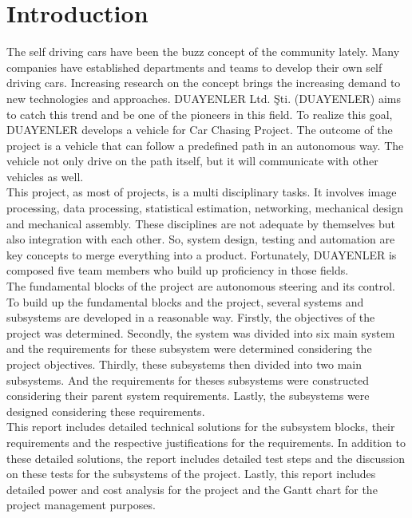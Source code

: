 \documentclass[a4paper,12pt]{article}
\begin{document}

\tableofcontents

\newpage


\section{Introduction}

The self driving cars have been the buzz concept of the community lately. Many companies have established departments and teams to develop their own self driving cars. Increasing research on the concept brings the increasing demand to new technologies and approaches. DUAYENLER Ltd. Şti. (DUAYENLER) aims to catch this trend and be one of the pioneers in this field. To realize this goal, DUAYENLER develops a vehicle for Car Chasing Project. The outcome of the project is a vehicle that can follow a predefined path in an autonomous way. The vehicle not only drive on the path itself, but it will communicate with other vehicles as well.\\

This project, as most of projects, is a multi disciplinary tasks. It involves image processing, data processing, statistical estimation, networking, mechanical design and mechanical assembly. These disciplines are not adequate by themselves but also integration with each other. So, system design, testing and automation are key concepts to merge everything into a product. Fortunately, DUAYENLER is composed five team members who build up proficiency in those fields.\\

The fundamental blocks of the project are autonomous steering and its control. To build up the fundamental blocks and the project, several systems and subsystems are developed in a reasonable way. Firstly, the objectives of the project was determined. Secondly, the system was divided into six main system and the requirements for these subsystem were determined considering the project objectives. Thirdly, these subsystems then divided into two main subsystems. And the requirements for theses subsystems were constructed considering their parent system requirements. Lastly, the subsystems were designed considering these requirements.\\

This report includes detailed technical solutions for the subsystem blocks, their requirements and the respective justifications for the requirements. In addition to these detailed solutions, the report includes detailed test steps and the discussion on these tests for the subsystems of the project. Lastly, this report includes detailed power and cost analysis for the project and the Gantt chart for the project management purposes.
\newpage
\end{document}
